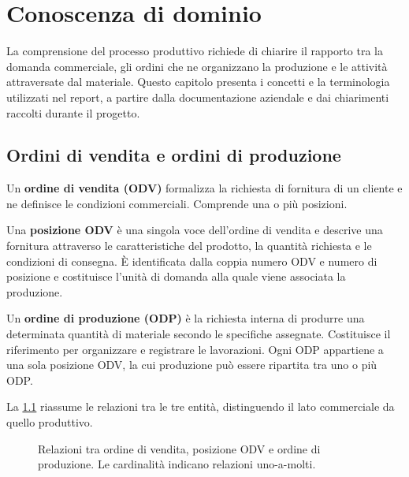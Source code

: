 \chapter{Conoscenza di dominio}
\label{sec:domain-knowledge}

La comprensione del processo produttivo richiede di chiarire il rapporto tra la domanda commerciale, gli ordini che ne organizzano la produzione e le attività attraversate dal materiale. Questo capitolo presenta i concetti e la terminologia utilizzati nel report, a partire dalla documentazione aziendale e dai chiarimenti raccolti durante il progetto.

\section{Ordini di vendita e ordini di produzione}
\label{sec:odv-odp}

Un \textbf{ordine di vendita (ODV)} formalizza la richiesta di fornitura di un cliente e ne definisce le condizioni commerciali. Comprende una o più posizioni.

Una \textbf{posizione ODV} è una singola voce dell'ordine di vendita e descrive una fornitura attraverso le caratteristiche del prodotto, la quantità richiesta e le condizioni di consegna. È identificata dalla coppia numero ODV e numero di posizione e costituisce l'unità di domanda alla quale viene associata la produzione.

Un \textbf{ordine di produzione (ODP)} è la richiesta interna di produrre una determinata quantità di materiale secondo le specifiche assegnate. Costituisce il riferimento per organizzare e registrare le lavorazioni. Ogni ODP appartiene a una sola posizione ODV, la cui produzione può essere ripartita tra uno o più ODP.

La \cref{fig:order-hierarchy} riassume le relazioni tra le tre entità, distinguendo il lato commerciale da quello produttivo.

\begin{figure}[htbp]
\centering
\reportfigurecontent{}
\caption{Relazioni tra ordine di vendita, posizione ODV e ordine di produzione. Le cardinalità indicano relazioni uno-a-molti.}
\label{fig:order-hierarchy}
\end{figure}

